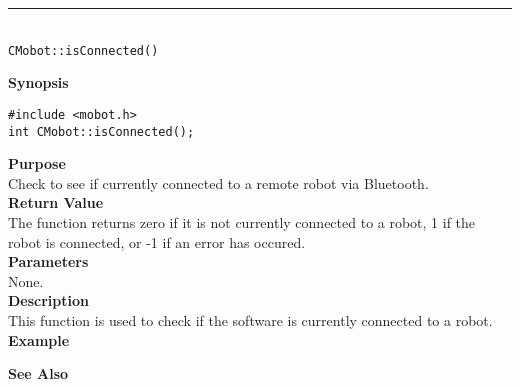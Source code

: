 \noindent
\vspace{5pt}
\rule{4.5in}{0.015in}\\
\noindent
{\LARGE \texttt{CMobot::isConnected()}}\\
{}

\noindent
{\bf Synopsis}\\
\begin{verbatim}
#include <mobot.h>
int CMobot::isConnected();
\end{verbatim}

\noindent
{\bf Purpose}\\
Check to see if currently connected to a remote robot via Bluetooth.\\

\noindent
{\bf Return Value}\\
The function returns zero if it is not currently connected to a robot, 1 if the robot 
is connected, or -1 if an error has occured.\\

\noindent
{\bf Parameters}\\
None.\\

\noindent
{\bf Description}\\
This function is used to check if the software is currently connected to
a robot.\\

\noindent
{\bf Example}\\
\noindent

\noindent
{\bf See Also}\\

